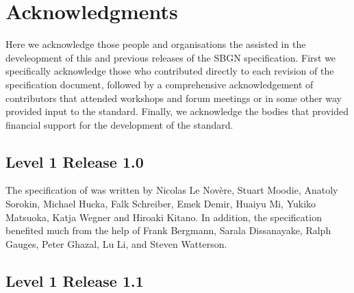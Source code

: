\chapter{Acknowledgments}\label{sec:acknowledgments}

Here we acknowledge those people and organisations the assisted in the develeopment of this and previous releases of the SBGN \PDl specification. First we specifically acknowledge those who contributed directly to each revision of the  specification document, followed by a comprehensive acknowledgement of contributors that attended workshops and forum meetings or in some other way provided input to the standard. Finally, we acknowledge the bodies that provided financial support for the development of the standard.



\section{Level 1 Release 1.0}

The specification of was written by Nicolas Le Nov\`{e}re, 
Stuart Moodie, Anatoly Sorokin, Michael Hucka, Falk Schreiber, Emek Demir, 
Huaiyu Mi, Yukiko Matsuoka, Katja Wegner and Hiroaki Kitano. In addition, 
the specification benefited much from the help of Frank Bergmann, Sarala 
Dissanayake, Ralph Gauges, Peter Ghazal, Lu Li, and Steven Watterson.


\section{Level 1 Release 1.1}


